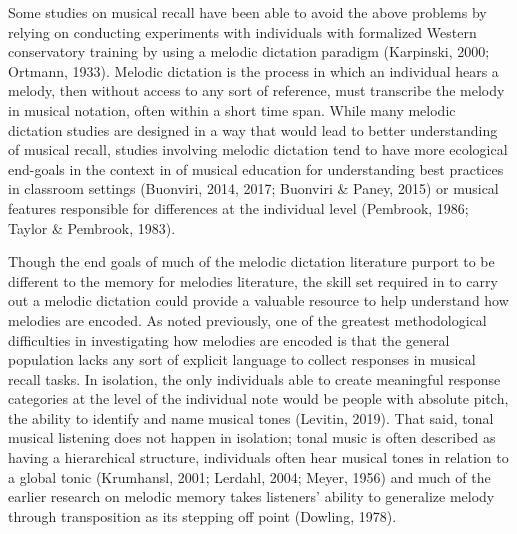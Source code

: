 \documentclass[english,man,floatsintext]{apa6}
\begin{document}
Some studies on musical recall have been able to avoid the above problems by relying on conducting experiments with individuals with formalized Western conservatory training by using a melodic dictation paradigm (Karpinski, 2000; Ortmann, 1933).
Melodic dictation is the process in which an individual hears a melody, then without access to any sort of reference, must transcribe the melody in musical notation, often within a short time span.
While many melodic dictation studies are designed in a way that would lead to better understanding of musical recall, studies involving melodic dictation tend to have more ecological end-goals in the context in of musical education for understanding best practices in classroom settings (Buonviri, 2014, 2017; Buonviri \& Paney, 2015) or musical features responsible for differences at the individual level (Pembrook, 1986; Taylor \& Pembrook, 1983).

Though the end goals of much of the melodic dictation literature purport to be different to the memory for melodies literature, the skill set required in to carry out a melodic dictation could provide a valuable resource to help understand how melodies are encoded.
As noted previously, one of the greatest methodological difficulties in investigating how melodies are encoded is that the general population lacks any sort of explicit language to collect responses in musical recall tasks.
In isolation, the only individuals able to create meaningful response categories at the level of the individual note would be people with absolute pitch, the ability to identify and name musical tones (Levitin, 2019).
That said, tonal musical listening does not happen in isolation; tonal music is often described as having a hierarchical structure, individuals often hear musical tones in relation to a global tonic (Krumhansl, 2001; Lerdahl, 2004; Meyer, 1956) and much of the earlier research on melodic memory takes listeners' ability to generalize melody through transposition as its stepping off point (Dowling, 1978).
\end{document}
